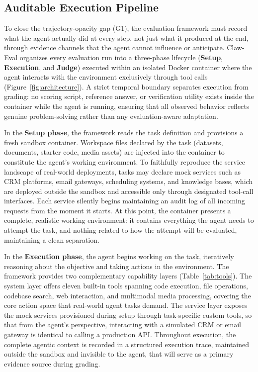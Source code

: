 \documentclass{article}
\begin{document}
\subsection{Auditable Execution Pipeline}
\label{sec:execution}

To close the trajectory-opacity gap (G1), the evaluation framework must record what the agent actually did at every step, not just what it produced at the end, through evidence channels that the agent cannot influence or anticipate. Claw-Eval organizes every evaluation run into a three-phase lifecycle (\textbf{Setup}, \textbf{Execution}, and \textbf{Judge}) executed within an isolated Docker container where the agent interacts with the environment exclusively through tool calls (Figure~\ref{fig:architecture}). A strict temporal boundary separates execution from grading: no scoring script, reference answer, or verification utility exists inside the container while the agent is running, ensuring that all observed behavior reflects genuine problem-solving rather than any evaluation-aware adaptation.

In the \textbf{Setup phase}, the framework reads the task definition and provisions a fresh sandbox container. Workspace files declared by the task (datasets, documents, starter code, media assets) are injected into the container to constitute the agent's working environment. To faithfully reproduce the service landscape of real-world deployments, tasks may declare mock services such as CRM platforms, email gateways, scheduling systems, and knowledge bases, which are deployed outside the sandbox and accessible only through designated tool-call interfaces. Each service silently begins maintaining an audit log of all incoming requests from the moment it starts. At this point, the container presents a complete, realistic working environment: it contains everything the agent needs to attempt the task, and nothing related to how the attempt will be evaluated, maintaining a clean separation. 

In the \textbf{Execution phase}, the agent begins working on the task, iteratively reasoning about the objective and taking actions in the environment. The framework provides two complementary capability layers (Table~\ref{tab:tools}). The system layer offers eleven built-in tools spanning code execution, file operations, codebase search, web interaction, and multimodal media processing, covering the core action space that real-world agent tasks demand. The service layer exposes the mock services provisioned during setup through task-specific custom tools, so that from the agent's perspective, interacting with a simulated CRM or email gateway is identical to calling a production API. Throughout execution, the complete agentic context is recorded in a structured execution trace, maintained outside the sandbox and invisible to the agent, that will serve as a primary evidence source during grading.
\end{document}
